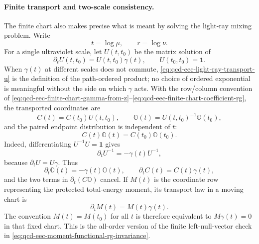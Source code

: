\paragraph{Finite transport and two-scale consistency.}
The finite chart also makes precise what is meant by solving the light-ray
mixing problem.  Write
\[
  t=\log\mu,\qquad r=\log\nu .
\]
For a single ultraviolet scale, let \(U(t,t_0)\) be the matrix solution of
\begin{equation}
  \partial_tU(t,t_0)=U(t,t_0)\gamma(t),
  \qquad
  U(t_0,t_0)=\mathbf 1 .
  \label{eq:qcd-eec-light-ray-transport-u}
\end{equation}
When \(\gamma(t)\) at different scales does not commute,
\eqref{eq:qcd-eec-light-ray-transport-u} is the definition of the
path-ordered product; no choice of ordered exponential is meaningful without
the side on which \(\gamma\) acts.  With the row/column convention of
\eqref{eq:qcd-eec-finite-chart-gamma-from-z}--\eqref{eq:qcd-eec-finite-chart-coefficient-rg},
the transported coordinates are
\begin{equation}
  C(t)=C(t_0)U(t,t_0),
  \qquad
  \mathbb O(t)=U(t,t_0)^{-1}\mathbb O(t_0),
  \label{eq:qcd-eec-light-ray-transport-pair}
\end{equation}
and the paired endpoint distribution is independent of \(t\):
\[
  C(t)\mathbb O(t)=C(t_0)\mathbb O(t_0).
\]
Indeed, differentiating \(U^{-1}U=\mathbf 1\) gives
\[
  \partial_tU^{-1}=-\gamma(t)U^{-1},
\]
because \(\partial_tU=U\gamma\).  Thus
\[
  \partial_t\mathbb O(t)=-\gamma(t)\mathbb O(t),
  \qquad
  \partial_tC(t)=C(t)\gamma(t),
\]
and the two terms in \(\partial_t(C\mathbb O)\) cancel.  If \(M(t)\) is the
coordinate row representing the protected total-energy moment, its transport
law in a moving chart is
\begin{equation}
  \partial_tM(t)=M(t)\gamma(t).
  \label{eq:qcd-eec-light-ray-moment-transport}
\end{equation}
The convention \(M(t)=M(t_0)\) for all \(t\) is therefore equivalent to
\(M\gamma(t)=0\) in that fixed chart.  This is the all-order version of the
finite left-null-vector check in
\eqref{eq:qcd-eec-moment-functional-rg-invariance}.


